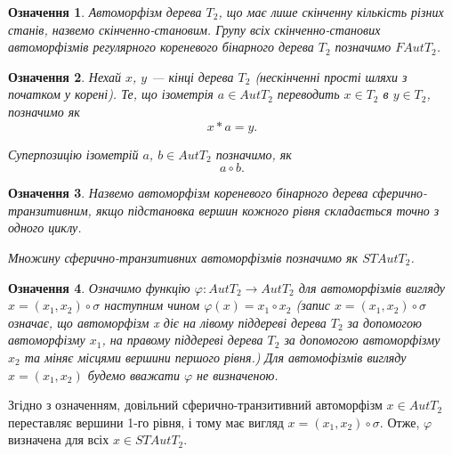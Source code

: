 \documentclass[a4paper,12pt]{article} \usepackage{a4wide}
\numberwithin{equation}{subsection}
\newtheorem{definition}{Означення}[subsection]
\begin{document}
\begin{definition}
 Автоморфізм дерева  $T_2$, що має лише скінченну кількість різних станів, назвемо скінченно-становим.
Групу всіх скінченно-станових автоморфізмів регулярного кореневого бінарного дерева   $T_2$
 позначимо $FAutT_2$.
\end{definition}


\begin{definition}
Нехай $x$, $y$ --- кінці дерева $T_2$ (нескінченні прості шляхи з початком у корені).
Те, що ізометрія $a \in AutT_2$ переводить $x\in T_2$ в $y\in T_2$, позначимо як
$$x*a = y.$$

Суперпозицію ізометрій $a$, $b\in AutT_2$ позначимо, як
$$a\circ b.$$
\end{definition}

\begin{definition}
Назвемо автоморфізм кореневого бінарного дерева
  сферично-транзитивним, якщо підстановка вершин кожного рівня складається точно з одного циклу.


  Множину сферично-транзитивних автоморфізмів позначимо як $STAutT_2$.
\end{definition}



\begin{definition}
  Означимо функцію $\varphi : AutT_2\rightarrow AutT_2$ для автоморфізмів вигляду $x=(x_1,x_2)\circ\sigma $   наступним
  чином $\varphi (x)=x_1\circ x_2$ (запис
  $x=(x_1,x_2)\circ\sigma $ означає, що автоморфізм x діє на лівому
  піддереві дерева $T_2$ за допомогою автоморфізму $x_1$, на правому
  піддереві дерева $T_2$ за допомогою автоморфізму $x_2$ та міняє
  місцями вершини першого рівня.) Для автомофізмів вигляду $x=(x_1,x_2)$ будемо вважати $\varphi$ не визначеною.
\end{definition}


Згідно з означенням, довільний сферично-транзитивний автоморфізм $x \in AutT_2$ переставляє вершини 1-го рівня, і тому має вигляд   $x=(x_1,x_2)\circ\sigma$. Отже, $\varphi$ визначена для всіх $x \in STAutT_2$.
\end{document}
